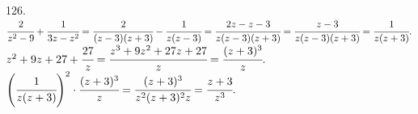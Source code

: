126. $\cfrac{2}{z^2-9}+\cfrac{1}{3z-z^2}=\cfrac{2}{(z-3)(z+3)}-\cfrac{1}{z(z-3)}=\cfrac{2z-z-3}{z(z-3)(z+3)}=\cfrac{z-3}{z(z-3)(z+3)}=\cfrac{1}{z(z+3)}.$\\
$z^2+9z+27+\cfrac{27}{z}=\cfrac{z^3+9z^2+27z+27}{z}=\cfrac{(z+3)^3}{z}.$\\
$\left(\cfrac{1}{z(z+3)}\right)^2\cdot\cfrac{(z+3)^3}{z}=\cfrac{(z+3)^3}{z^2(z+3)^2z}=\cfrac{z+3}{z^3}.$\\
